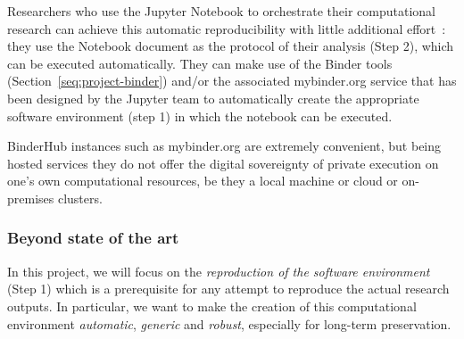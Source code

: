 \medskip Researchers who use the Jupyter Notebook to orchestrate their
computational research can achieve this automatic
reproducibility with little additional effort~\cite{Beg2021}: they use the Notebook document as
the protocol of their analysis (Step 2), which can be executed automatically.
They can make use of the Binder tools (Section~\ref{seq:project-binder}) and/or the
associated mybinder.org service that has
been designed by the Jupyter team to automatically create the appropriate
software environment (step 1) in which the notebook can be executed.

BinderHub instances such as mybinder.org are extremely convenient,
but being hosted services they do not offer the digital sovereignty
of private execution on one's own computational resources,
be they a local machine or cloud or on-premises clusters.

\subsubsection{Beyond state of the art}

In this project, we will focus on the \emph{reproduction of the
software environment} (Step 1) which is a prerequisite for any attempt to
reproduce the actual research outputs. In particular, we want to make the
creation of this computational environment \emph{automatic}, \emph{generic} and \emph{robust},
especially for long-term preservation.


